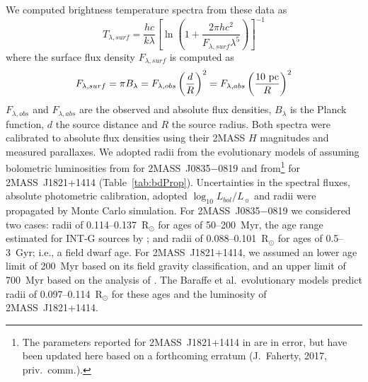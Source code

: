 \documentclass[twocolumn]{aastex6}
\newcommand{\lbol}{$\log_{10}{L_{bol}/L_{\sun}}$}
\newcommand{\sha}{2MASS~J0835$-$0819}
\newcommand{\shb}{2MASS~J1821+1414}
\begin{document}
We computed brightness temperature spectra from these data as
\begin{equation}
T_{\lambda,surf} = \frac{hc}{k\lambda}\left[\ln\left(1+\frac{2\pi{hc^2}}{F_{\lambda,surf}\lambda^5}\right)\right]^{-1}
\end{equation}
where the surface flux density $F_{\lambda,surf}$ is computed as
\begin{equation}
F_{\lambda,surf} = {\pi}B_{\lambda} = F_{\lambda,obs}\left(\frac{d}{R}\right)^2 = F_{\lambda,abs}\left(\frac{10~{\rm pc}}{R}\right)^2
\end{equation}
$F_{\lambda,obs}$ and $F_{\lambda,abs}$ are the observed and absolute flux densities, $B_\lambda$ is the Planck function, $d$ the source distance and $R$ the source radius.  Both spectra were calibrated to absolute flux densities using their 2MASS $H$ magnitudes and measured parallaxes. We adopted radii from the evolutionary models of \citet{2003A&A...402..701B} assuming bolometric luminosities from \citet{2015ApJ...810..158F} for {\sha} and from\footnote{The parameters reported for {\shb} in \citet{2016ApJS..225...10F} are in error, but have been updated here based on a forthcoming erratum (J.\ Faherty, 2017, priv.\ comm.).} \citet{2016ApJS..225...10F} for {\shb} (Table~\ref{tab:bdProp}). Uncertainties in the spectral fluxes, absolute photometric calibration, adopted {\lbol} and radii were propagated by Monte Carlo simulation.  For {\sha} we considered two cases: radii of 0.114--0.137~R$_{\odot}$ for ages of 50--200~Myr, the age range estimated for INT-G sources by \citet{2013ApJ...772...79A}; and radii of 0.088--0.101~R$_{\odot}$ for ages of 0.5--3~Gyr; i.e., a field dwarf age.
For {\shb}, we assumed an lower age limit of 200~Myr based on its field gravity classification, and an upper limit of 700~Myr based on the analysis of \citet{2016MNRAS.455..357S}. The Baraffe et al.\ evolutionary models predict radii of 0.097--0.114~R$_{\odot}$ for these ages and the luminosity of {\shb}.  
\end{document}
